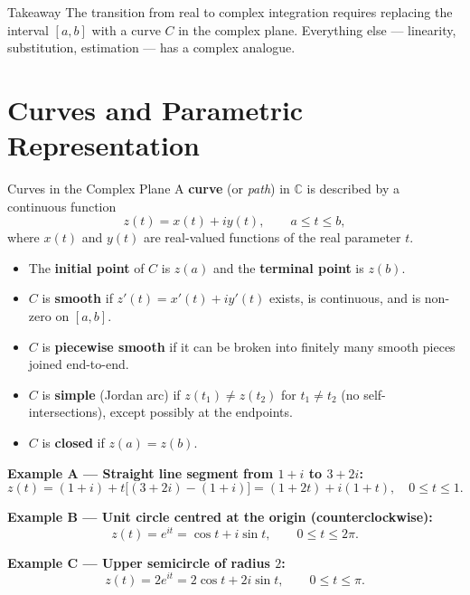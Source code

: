 \documentclass[12pt,a4paper]{article}
\begin{document}
\begin{learnbox}{Takeaway}
The transition from real to complex integration requires replacing the interval
$[a,b]$ with a curve $C$ in the complex plane. Everything else --- linearity,
substitution, estimation --- has a complex analogue.
\end{learnbox}

\section{Curves and Parametric Representation}
\begin{infobox}{Curves in the Complex Plane}
A \textbf{curve} (or \emph{path}) in $\mathbb{C}$ is described by a
continuous function
\[
  z(t) = x(t) + iy(t), \qquad a \le t \le b,
\]
where $x(t)$ and $y(t)$ are real-valued functions of the real parameter $t$.

\begin{itemize}[leftmargin=*, nosep]
  \item The \textbf{initial point} of $C$ is $z(a)$ and the \textbf{terminal
        point} is $z(b)$.
  \item $C$ is \textbf{smooth} if $z'(t) = x'(t) + iy'(t)$ exists, is
        continuous, and is non-zero on $[a,b]$.
  \item $C$ is \textbf{piecewise smooth} if it can be broken into finitely many
        smooth pieces joined end-to-end.
  \item $C$ is \textbf{simple} (Jordan arc) if $z(t_1) \ne z(t_2)$ for
        $t_1 \ne t_2$ (no self-intersections), except possibly at the
        endpoints.
  \item $C$ is \textbf{closed} if $z(a) = z(b)$.
\end{itemize}
\end{infobox}

\textbf{Example A --- Straight line segment from $1+i$ to $3+2i$:}
\[
  z(t) = (1+i) + t\bigl[(3+2i)-(1+i)\bigr] = (1+2t) + i(1+t), \quad 0 \le t \le 1.
\]

\textbf{Example B --- Unit circle centred at the origin (counterclockwise):}
\[
  z(t) = e^{it} = \cos t + i\sin t, \qquad 0 \le t \le 2\pi.
\]

\textbf{Example C --- Upper semicircle of radius $2$:}
\[
  z(t) = 2e^{it} = 2\cos t + 2i\sin t, \qquad 0 \le t \le \pi.
\]
\end{document}
